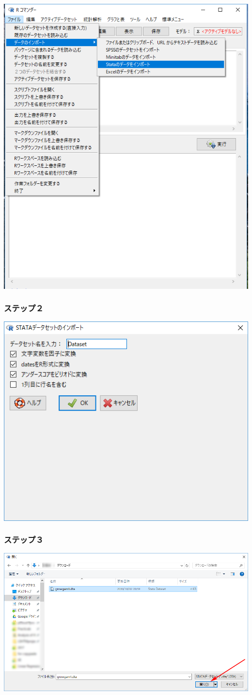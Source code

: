 \documentclass[]{problemset}
\begin{document}
\begin{center}\includegraphics[width=0.8\linewidth]{pic/import00} \end{center}

\hypertarget{-1}{%
\subsubsection{ステップ２}\label{-1}}

\begin{center}\includegraphics[width=0.5\linewidth]{pic/import02} \end{center}

\hypertarget{-2}{%
\subsubsection{ステップ３}\label{-2}}

\begin{center}\includegraphics[width=0.7\linewidth]{pic/import03} \end{center}
\end{document}

